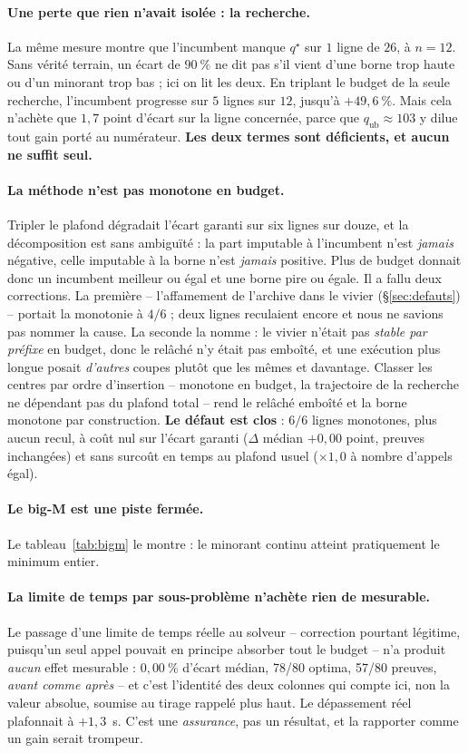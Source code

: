 \documentclass[11pt,a4paper]{article}
\theoremstyle{plain}
\theoremstyle{remark}
\newcommand{\qs}{q^{\star}}
\begin{document}
\paragraph{Une perte que rien n'avait isolée : la recherche.} La même mesure
montre que l'incumbent manque $\qs$ sur $1$ ligne de $26$, à $n=12$. Sans vérité terrain, un écart de $90\ \%$ ne dit pas s'il vient
d'une borne trop haute ou d'un minorant trop bas ; ici on lit les deux. En
triplant le budget de la seule recherche, l'incumbent progresse sur $5$
lignes sur $12$, jusqu'à $+49{,}6\ \%$. Mais cela n'achète que $1{,}7$ point
d'écart sur la ligne concernée, parce que $q_{\text{ub}}\approx 103$ y
dilue tout gain porté au numérateur. \textbf{Les deux termes sont
déficients, et aucun ne suffit seul.}

\paragraph{La méthode n'est pas monotone en budget.} Tripler le plafond
dégradait l'écart garanti sur six lignes sur douze, et la décomposition est
sans ambiguïté : la part imputable à l'incumbent n'est \emph{jamais}
négative, celle imputable à la borne n'est \emph{jamais} positive. Plus de
budget donnait donc un incumbent meilleur ou égal et une borne pire ou
égale. Il a fallu deux corrections. La première -- l'affamement de l'archive dans
le vivier (§\ref{sec:defauts}) -- portait la monotonie à $4/6$ ; deux lignes
reculaient encore et nous ne savions pas nommer la cause. La seconde la
nomme : le vivier n'était pas \emph{stable par préfixe} en budget, donc le
relâché n'y était pas emboîté, et une exécution plus longue posait
\emph{d'autres} coupes plutôt que les mêmes et davantage. Classer les
centres par ordre d'insertion -- monotone en budget, la trajectoire de la
recherche ne dépendant pas du plafond total -- rend le relâché emboîté et la
borne monotone par construction. \textbf{Le défaut est clos} : $6/6$ lignes
monotones, plus aucun recul, à coût nul sur l'écart garanti ($\Delta$ médian
$+0{,}00$ point, preuves inchangées) et sans surcoût en temps au plafond
usuel ($\times 1{,}0$ à nombre d'appels égal).

\paragraph{Le big-M est une piste fermée.} Le tableau~\ref{tab:bigm} le
montre : le minorant continu atteint pratiquement le minimum entier.

\paragraph{La limite de temps par sous-problème n'achète rien de mesurable.}
Le passage d'une limite de temps réelle au solveur -- correction pourtant
légitime, puisqu'un seul appel pouvait en principe absorber tout le budget --
n'a produit \emph{aucun} effet mesurable : $0{,}00\ \%$ d'écart médian,
78/80 optima, 57/80 preuves, \emph{avant comme après} -- et c'est
l'identité des deux colonnes qui compte ici, non la valeur absolue, soumise
au tirage rappelé plus haut. Le dépassement réel
plafonnait à $+1{,}3$~s. C'est une \emph{assurance}, pas un résultat, et la
rapporter comme un gain serait trompeur.
\end{document}
